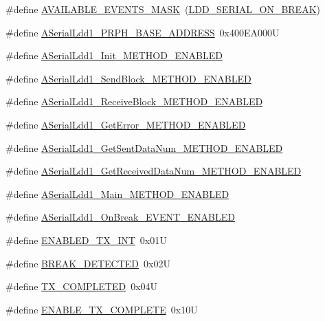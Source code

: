 \begin{DoxyCompactItemize}
\item 
\#define \hyperlink{group___a_serial_ldd1__module_ga5f04a8830cd52a3ffa1678d113f31aee}{A\+V\+A\+I\+L\+A\+B\+L\+E\+\_\+\+E\+V\+E\+N\+T\+S\+\_\+\+M\+A\+SK}~(\hyperlink{group___p_e___types__module_ga5791992a91907e5233a850cd45ea8c21}{L\+D\+D\+\_\+\+S\+E\+R\+I\+A\+L\+\_\+\+O\+N\+\_\+\+B\+R\+E\+AK})
\item 
\#define \hyperlink{group___a_serial_ldd1__module_gad9f8e308ce0b459724fa9063778226f3}{A\+Serial\+Ldd1\+\_\+\+P\+R\+P\+H\+\_\+\+B\+A\+S\+E\+\_\+\+A\+D\+D\+R\+E\+SS}~0x400\+E\+A000U
\item 
\#define \hyperlink{group___a_serial_ldd1__module_ga84f54fa4124bc3dd49cf50bcc270179e}{A\+Serial\+Ldd1\+\_\+\+Init\+\_\+\+M\+E\+T\+H\+O\+D\+\_\+\+E\+N\+A\+B\+L\+ED}
\item 
\#define \hyperlink{group___a_serial_ldd1__module_ga509640fb9027c94e88c56ac41d695f7b}{A\+Serial\+Ldd1\+\_\+\+Send\+Block\+\_\+\+M\+E\+T\+H\+O\+D\+\_\+\+E\+N\+A\+B\+L\+ED}
\item 
\#define \hyperlink{group___a_serial_ldd1__module_ga1aee05f3a9c0f5ae70acda61f9168dec}{A\+Serial\+Ldd1\+\_\+\+Receive\+Block\+\_\+\+M\+E\+T\+H\+O\+D\+\_\+\+E\+N\+A\+B\+L\+ED}
\item 
\#define \hyperlink{group___a_serial_ldd1__module_gab680be05b2b7c712d928dbd5714e76f3}{A\+Serial\+Ldd1\+\_\+\+Get\+Error\+\_\+\+M\+E\+T\+H\+O\+D\+\_\+\+E\+N\+A\+B\+L\+ED}
\item 
\#define \hyperlink{group___a_serial_ldd1__module_ga6a44711daa97468b874281f3f1fb506c}{A\+Serial\+Ldd1\+\_\+\+Get\+Sent\+Data\+Num\+\_\+\+M\+E\+T\+H\+O\+D\+\_\+\+E\+N\+A\+B\+L\+ED}
\item 
\#define \hyperlink{group___a_serial_ldd1__module_ga76abb4ca82d4d5f0eac00109d3546fb6}{A\+Serial\+Ldd1\+\_\+\+Get\+Received\+Data\+Num\+\_\+\+M\+E\+T\+H\+O\+D\+\_\+\+E\+N\+A\+B\+L\+ED}
\item 
\#define \hyperlink{group___a_serial_ldd1__module_gac5250a085695769068d0d4153937f06a}{A\+Serial\+Ldd1\+\_\+\+Main\+\_\+\+M\+E\+T\+H\+O\+D\+\_\+\+E\+N\+A\+B\+L\+ED}
\item 
\#define \hyperlink{group___a_serial_ldd1__module_gaa1fbbf5b726d5b064e6f772a364572c8}{A\+Serial\+Ldd1\+\_\+\+On\+Break\+\_\+\+E\+V\+E\+N\+T\+\_\+\+E\+N\+A\+B\+L\+ED}
\item 
\#define \hyperlink{group___a_serial_ldd1__module_gab05896dbf11eed7f4078978e7287669d}{E\+N\+A\+B\+L\+E\+D\+\_\+\+T\+X\+\_\+\+I\+NT}~0x01U
\item 
\#define \hyperlink{group___a_serial_ldd1__module_ga617e6f524bf659f58012c8f0248004e5}{B\+R\+E\+A\+K\+\_\+\+D\+E\+T\+E\+C\+T\+ED}~0x02U
\item 
\#define \hyperlink{group___a_serial_ldd1__module_ga1f79d891cf81d9f65cccd3a0ab84b1ee}{T\+X\+\_\+\+C\+O\+M\+P\+L\+E\+T\+ED}~0x04U
\item 
\#define \hyperlink{group___a_serial_ldd1__module_gac0fc7ebba74ca47c17389980225ddf48}{E\+N\+A\+B\+L\+E\+\_\+\+T\+X\+\_\+\+C\+O\+M\+P\+L\+E\+TE}~0x10U
\end{DoxyCompactItemize}
